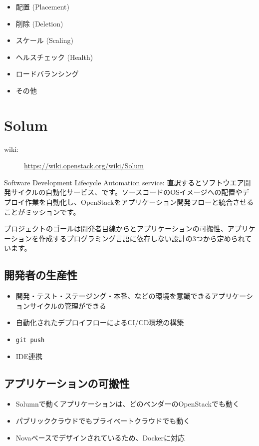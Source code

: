 \begin{itemize}
	\item 配置 (Placement)
	\item 削除 (Deletion)
	\item スケール (Scaling)
	\item ヘルスチェック (Health)
	\item ロードバランシング
	\item その他
\end{itemize}

\section{Solum}
\begin{description}
	\item[wiki:] \url{https://wiki.openstack.org/wiki/Solum}
\end{description}
Software Development Lifecycle Automation service: 直訳するとソフトウエア開発サイクルの自動化サービス、です。ソースコードのOSイメージへの配置やデプロイ作業を自動化し、OpenStackをアプリケーション開発フローと統合させることがミッションです。

プロジェクトのゴールは開発者目線からとアプリケーションの可搬性、アプリケーションを作成するプログラミング言語に依存しない設計の3つから定められています。

\subsection*{開発者の生産性}
\begin{itemize}
	\item 開発・テスト・ステージング・本番、などの環境を意識できるアプリケーションサイクルの管理ができる
	\item 自動化されたデプロイフローによるCI/CD環境の構築
	\item \verb|git push|
	\item IDE連携
\end{itemize}

\subsection*{アプリケーションの可搬性}
\begin{itemize}
	\item Solumnで動くアプリケーションは、どのベンダーのOpenStackでも動く
	\item パブリッククラウドでもプライベートクラウドでも動く
	\item Novaベースでデザインされているため、Dockerに対応
\end{itemize}

